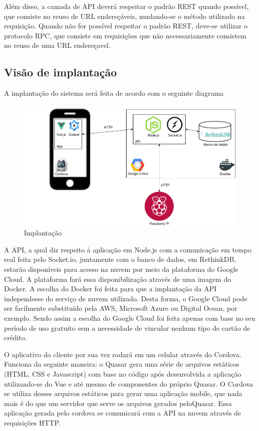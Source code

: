 \begin{apendicesenv}
Além disso, a camada de API deverá respeitar o padrão REST quando possível, que consiste no reuso de URL endereçáveis, mudando-se o método utilizado na requisição. Quando não for possível respeitar o padrão REST, deve-se utilizar o protocolo RPC, que consiste em requisições que não necessariamente consistem no reuso de uma URL endereçavel.

\subsection{Visão de implantação}
A implantação do sistema será feita de acordo com o seguinte diagrama

\begin{figure}[!ht]
	\centering
		\includegraphics[scale=0.4]{figuras/software/9-implantacao.png}
	\caption{Implantação}
\end{figure}

A API, a qual diz respeito à aplicação em Node.js com a comunicação em tempo real feita pelo Socket.io, juntamente com o banco de dados, em RethinkDB, estarão disponíveis para acesso na nuvem por meio da plataforma do Google Cloud. A plataforma fará essa disponibilização através de uma imagem do Docker. A escolha do Docker foi feita para que a implantação da API independesse do serviço de nuvem utilizado. Desta forma, o Google Cloud pode ser facilmente substituído pela AWS, Microsoft Azure ou Digital Ocean, por exemplo. Sendo assim a escolha do Google Cloud foi feita apenas com base no seu período de uso gratuito sem a necessidade de vincular nenhum tipo de cartão de crédito.

O aplicativo do cliente por sua vez rodará em um celular através do Cordova. Funciona da seguinte maneira: o Quasar gera uma série de arquivos estáticos (HTML, CSS e Javascript) com base no código após desenvolvida a aplicação utilizando-se do Vue e até mesmo de componentes do próprio Quasar. O Cordova se utiliza desses arquivos estáticos para gerar uma aplicação mobile, que nada mais é do que um servidor que serve os arquivos gerados peloQuasar. Essa aplicação gerada pelo cordova se comunicará com a API na nuvem através de requisições HTTP.


\end{apendicesenv}
